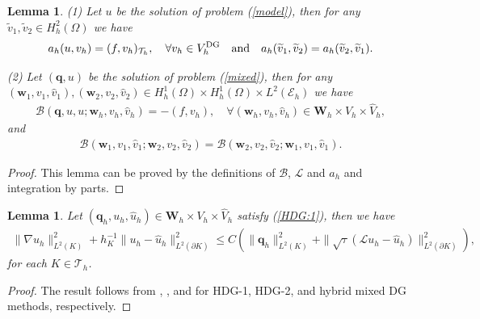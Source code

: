 \documentclass[1996/10/24]{amsart}
\newtheorem{lemma}[theorem]{Lemma}
\theoremstyle{definition}
\numberwithin{equation}{section}
\begin{document}
\begin{lemma}\label{dfp}
(1) Let $u$ be the solution of problem (\ref{model}), then for any $\widetilde{v}_1,\widetilde{v}_2\in H^2_h(\Omega)$ we have
\begin{align}
a_h(u,v_h)=(f,v_h)_{\mathcal{T}_h},\quad \forall v_h\in V_h^{{\rm DG}}\quad {\rm and}\quad a_h(\widetilde{v}_1,\widetilde{v}_2)=a_h(\widetilde{v}_2,\widetilde{v}_1).
\end{align}

(2) Let $({\bm q},u)$ be the solution of problem (\ref{mixed}), then for any $({\bm w}_1,v_1,\widehat{v}_1), ({\bm w}_2,v_2,\widehat{v}_2)\in H_h^1(\Omega)\times H_h^1(\Omega)\times L^2(\mathcal{E}_h)$ we have
\begin{align}
\mathcal{B}({\bm q},u,u;{\bm w}_h,v_h,\widehat{v}_h)=-(f,v_h),\quad \forall ({\bm w}_h,v_h,\widehat{v}_h)\in {\bm W}_h\times V_h\times \widehat{V}_h,
\end{align}
and
\begin{align}
\mathcal{B}({\bm w}_1,v_1,\widehat{v}_1;{\bm w}_2,v_2,\widehat{v}_2)=\mathcal{B}({\bm w}_2,v_2,\widehat{v}_2;{\bm w}_1,v_1,\widehat{v}_1).
\end{align}
\end{lemma}
\begin{proof}
This lemma can be proved by the definitions of $\mathcal{B}$, $\mathcal{L}$ and $a_h$ and integration by parts.
\end{proof}

\begin{lemma}\label{inequality}
Let $({\bm q}_h,u_h,\widehat{u}_h)\in {\bm W}_h\times V_h\times \widehat{V}_h$ satisfy (\ref{HDG:1}), then we have
\begin{align}
\|\nabla u_h\|^2_{L^2(K)}+h_K^{-1}\|u_h-\widehat{u}_h\|_{L^2(\partial K)}^2\leq C\left(\|{\bm q}_h\|^2_{L^2(K)}+\|\sqrt{\tau}(\mathcal{L}u_h-\widehat{u}_h)\|
^2_{L^2(\partial K)}\right),
\end{align}
for each $K\in\mathcal{T}_h$.
\end{lemma}
\begin{proof}
The result follows from \cite[Theorem 2.3]{cfq2018}, \cite[Lemma 3.2]{qs2016}, and \cite[Lemma 3.1]{es2010} for HDG-1, HDG-2, and hybrid mixed DG methods, respectively.
\end{proof}
\end{document}
